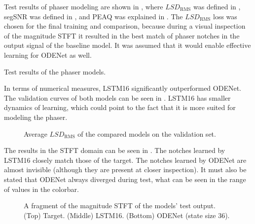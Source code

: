 Test results of phaser modeling are shown in , where $LSD_\text{RMS}$ was defined in , \ac{segSNR} was defined in , and \ac{PEAQ} was explained in . The $LSD_\text{RMS}$  loss was chosen for the final training and comparison, because during a visual inspection of the magnitude \ac{STFT} it resulted in the best match of phaser notches in the output signal of the baseline model. It was assumed that it would enable effective learning for ODENet as well.

\begin{table}[]
    \caption{Test results of the phaser models.}
    \centering
    
    \label{tab:phaser_results}
\end{table}

In terms of numerical measures, \ac{LSTM}16 significantly outperformed ODENet. The validation curves of both models can be seen in . \ac{LSTM}16 has smaller dynamics of learning, which could point to the fact that it is more suited for modeling the phaser.

\begin{figure}
    \centering
    
    \caption{Average $LSD_\text{RMS}$ of the compared models on the validation set.}
    \label{fig:phaser_lstm_vs_fe}
\end{figure}

The results in the \ac{STFT} domain can be seen in . The notches learned by \ac{LSTM}16 closely match those of the target. The notches learned by ODENet are almost invisible (although they are present at closer inspection). It must also be stated that ODENet always diverged during test, what can be seen in the range of values in the colorbar.

\newcommand{\scaleboxsizee}{0.8}
\begin{figure}
    \centering
    \begin{subfigure}{0.7\textwidth}
        \centering
        \scalebox{0.81}{}
    \end{subfigure}
    \begin{subfigure}{0.7\textwidth}
        \centering
        \scalebox{\scaleboxsizee}{}
    \end{subfigure}
    \begin{subfigure}{0.7\textwidth}
        \centering
        \scalebox{\scaleboxsizee}{}
    \end{subfigure}
    \caption{A fragment of the magnitude \ac{STFT} of the models' test output. (Top) Target. (Middle) \ac{LSTM}16. (Bottom) ODENet (state size 36).}
    \label{fig:phaser_test_spectrograms}
\end{figure}

